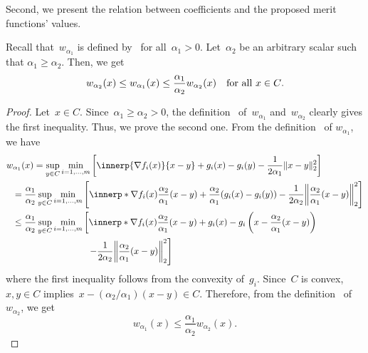 \documentclass[../main]{subfiles}
\begin{document}
Second, we present the relation between coefficients and the proposed merit functions' values.
\begin{theorem} 
    Recall that~$w_{\alpha_1}$ is defined by~ for all~$\alpha_1 > 0$.
    Let~$\alpha_2$ be an arbitrary scalar such that $\alpha_1 \ge \alpha_2$.
    Then, we get
    \begin{equation}
        w_{\alpha_2}(x) \le w_{\alpha_1}(x) \le \frac{\alpha_1}{\alpha_2} w_{\alpha_2}(x) \quad \text{for all~$x \in C$}
        .\end{equation}
\end{theorem}
\begin{proof}
    Let~$x \in C$.
    Since~$\alpha_1 \ge \alpha_2 > 0$, the definition~ of~$w_{\alpha_1}$ and~$w_{\alpha_2}$ clearly gives the first inequality.
    Thus, we prove the second one.
    From the definition~ of $w_{\alpha_1}$, we have
    \begin{align}
        \MoveEqLeft w_{\alpha_1}(x) = \sup_{y \in C} \min_{i = 1, \dots, m} \left[ \innerp{\nabla f_i(x)}{x - y} + g_i(x) - g_i(y) - \frac{1}{2 \alpha_1}\norm{x - y}_2^2 \right]                                                                                              \\
        ={}   & \frac{\alpha_1}{\alpha_2} \sup_{y \in C} \min_{i = 1, \dots, m} \left[ \innerp*{\nabla f_i(x)}{ \frac{\alpha_2}{\alpha_1}(x - y) } + \frac{\alpha_2}{\alpha_1}(g_i(x) - g_i(y)) - \frac{1}{2 \alpha_2} \norm*{ \frac{\alpha_2}{\alpha_1} (x - y) }_2^2 \right] \\
        \le{} & \frac{\alpha_1}{\alpha_2} \sup_{y \in C} \min_{i = 1, \dots, m} \left[ \innerp*{\nabla f_i(x)}{ \frac{\alpha_2}{\alpha_1} (x - y) } + g_i(x) - g_i \left(x - \frac{\alpha_2}{\alpha_1}(x - y)\right) \right.                                                   \\
              & \hspace{7em} \left. - \frac{1}{2 \alpha_2}\norm*{\frac{\alpha_2}{\alpha_1}(x - y)}_2^2 \right]
    \end{align}
    where the first inequality follows from the convexity of~$g_i$.
    Since~$C$ is convex, $x, y \in C$ implies~$x - (\alpha_2 / \alpha_1)(x - y) \in C$.
    Therefore, from the definition~ of~$w_{\alpha_2}$, we get
    \begin{equation}
        w_{\alpha_1}(x) \le \frac{\alpha_1}{\alpha_2} w_{\alpha_2}(x)
        .\end{equation}
\end{proof}
\end{document}
